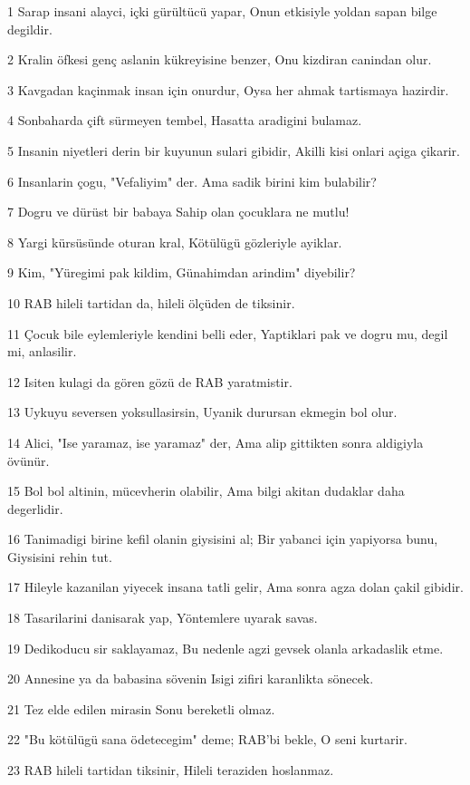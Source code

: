 \par 1 Sarap insani alayci, içki gürültücü yapar, Onun etkisiyle yoldan sapan bilge degildir.
\par 2 Kralin öfkesi genç aslanin kükreyisine benzer, Onu kizdiran canindan olur.
\par 3 Kavgadan kaçinmak insan için onurdur, Oysa her ahmak tartismaya hazirdir.
\par 4 Sonbaharda çift sürmeyen tembel, Hasatta aradigini bulamaz.
\par 5 Insanin niyetleri derin bir kuyunun sulari gibidir, Akilli kisi onlari açiga çikarir.
\par 6 Insanlarin çogu, "Vefaliyim" der. Ama sadik birini kim bulabilir?
\par 7 Dogru ve dürüst bir babaya Sahip olan çocuklara ne mutlu!
\par 8 Yargi kürsüsünde oturan kral, Kötülügü gözleriyle ayiklar.
\par 9 Kim, "Yüregimi pak kildim, Günahimdan arindim" diyebilir?
\par 10 RAB hileli tartidan da, hileli ölçüden de tiksinir.
\par 11 Çocuk bile eylemleriyle kendini belli eder, Yaptiklari pak ve dogru mu, degil mi, anlasilir.
\par 12 Isiten kulagi da gören gözü de RAB yaratmistir.
\par 13 Uykuyu seversen yoksullasirsin, Uyanik durursan ekmegin bol olur.
\par 14 Alici, "Ise yaramaz, ise yaramaz" der, Ama alip gittikten sonra aldigiyla övünür.
\par 15 Bol bol altinin, mücevherin olabilir, Ama bilgi akitan dudaklar daha degerlidir.
\par 16 Tanimadigi birine kefil olanin giysisini al; Bir yabanci için yapiyorsa bunu, Giysisini rehin tut.
\par 17 Hileyle kazanilan yiyecek insana tatli gelir, Ama sonra agza dolan çakil gibidir.
\par 18 Tasarilarini danisarak yap, Yöntemlere uyarak savas.
\par 19 Dedikoducu sir saklayamaz, Bu nedenle agzi gevsek olanla arkadaslik etme.
\par 20 Annesine ya da babasina sövenin Isigi zifiri karanlikta sönecek.
\par 21 Tez elde edilen mirasin Sonu bereketli olmaz.
\par 22 "Bu kötülügü sana ödetecegim" deme; RAB'bi bekle, O seni kurtarir.
\par 23 RAB hileli tartidan tiksinir, Hileli teraziden hoslanmaz.
